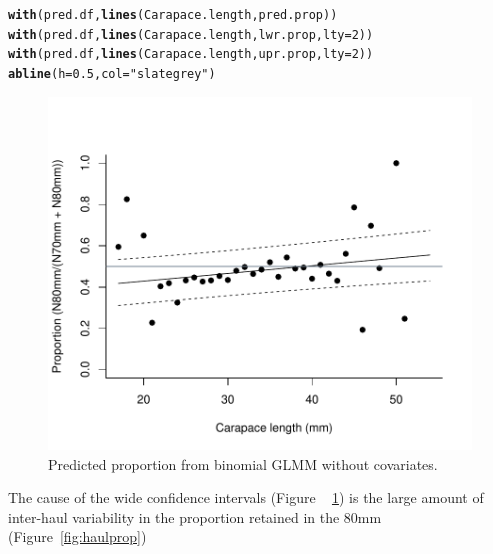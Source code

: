 \documentclass[12pt]{article}\usepackage[]{graphicx}\usepackage[]{color}
\makeatletter
\def\maxwidth{ %
  \ifdim\Gin@nat@width>\linewidth
    \linewidth
  \else
    \Gin@nat@width
  \fi
}
\newcommand{\hlnum}[1]{\textcolor[rgb]{0.686,0.059,0.569}{#1}}%
\newcommand{\hlstr}[1]{\textcolor[rgb]{0.192,0.494,0.8}{#1}}%
\newcommand{\hlstd}[1]{\textcolor[rgb]{0.345,0.345,0.345}{#1}}%
\newcommand{\hlkwc}[1]{\textcolor[rgb]{0.333,0.667,0.333}{#1}}%
\newcommand{\hlkwd}[1]{\textcolor[rgb]{0.737,0.353,0.396}{\textbf{#1}}}%
\newenvironment{kframe}{%
 \def\at@end@of@kframe{}%
 \ifinner\ifhmode%
  \def\at@end@of@kframe{\end{minipage}}%
  \begin{minipage}{\columnwidth}%
 \fi\fi%
 \def\FrameCommand##1{\hskip\@totalleftmargin \hskip-\fboxsep
 \colorbox{shadecolor}{##1}\hskip-\fboxsep
     \hskip-\linewidth \hskip-\@totalleftmargin \hskip\columnwidth}%
 \MakeFramed {\advance\hsize-\width
   \@totalleftmargin\z@ \linewidth\hsize
   \@setminipage}}%
 {\par\unskip\endMakeFramed%
 \at@end@of@kframe}
\newenvironment{knitrout}{}{} %
\makeatother
\begin{document}
\begin{knitrout}
\begin{kframe}
\begin{alltt}
\hlkwd{with}\hlstd{(pred.df,} \hlkwd{lines}\hlstd{(Carapace.length, pred.prop))}
\hlkwd{with}\hlstd{(pred.df,} \hlkwd{lines}\hlstd{(Carapace.length, lwr.prop,} \hlkwc{lty} \hlstd{=} \hlnum{2}\hlstd{))}
\hlkwd{with}\hlstd{(pred.df,} \hlkwd{lines}\hlstd{(Carapace.length, upr.prop,} \hlkwc{lty} \hlstd{=} \hlnum{2}\hlstd{))}
\hlkwd{abline}\hlstd{(}\hlkwc{h} \hlstd{=} \hlnum{0.5}\hlstd{,} \hlkwc{col} \hlstd{=} \hlstr{"slategrey"}\hlstd{)}
\end{alltt}
\end{kframe}\begin{figure}
\includegraphics[width=\maxwidth]{figure/glmmsimple-1} \caption[Predicted proportion from binomial GLMM without covariates]{Predicted proportion from binomial GLMM without covariates.}\label{fig:glmmsimple}
\end{figure}


\end{knitrout}

The cause of the wide confidence intervals (Figure ~ \ref{fig:glmmsimple}) is the large amount of inter-haul variability in the proportion retained in the 80mm (Figure~\ref{fig:haulprop})
\end{document}
